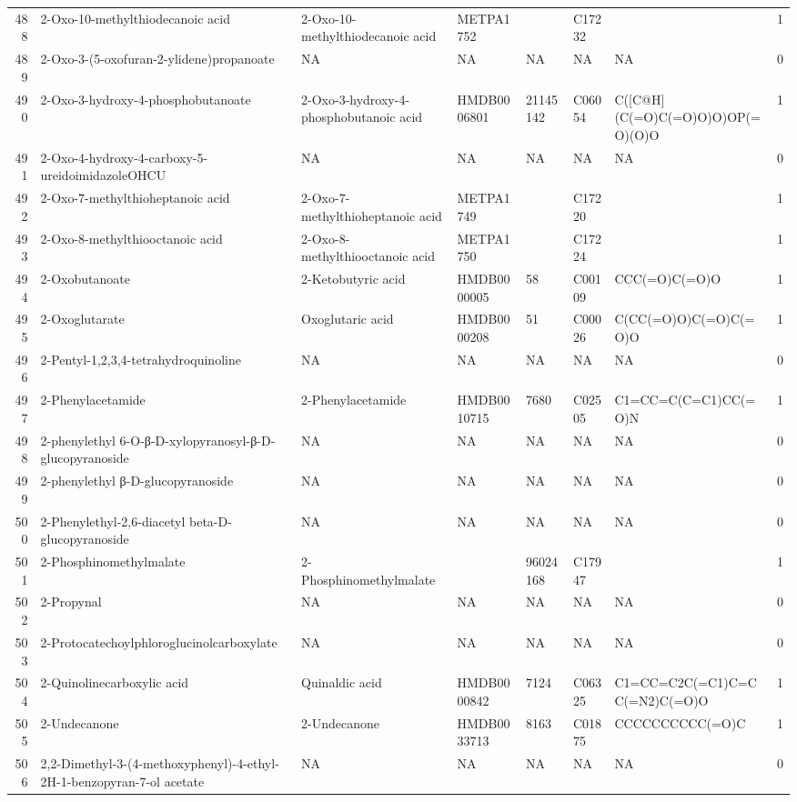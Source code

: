 \documentclass[a4paper]{article}
\begin{document}
\begin{longtable}{rlllllll}
  488 & 2-Oxo-10-methylthiodecanoic acid & 2-Oxo-10-methylthiodecanoic acid & METPA1752 &  & C17232 &  & 1 \\ 
  489 & 2-Oxo-3-(5-oxofuran-2-ylidene)propanoate & NA & NA & NA & NA & NA & 0 \\ 
  490 & 2-Oxo-3-hydroxy-4-phosphobutanoate & 2-Oxo-3-hydroxy-4-phosphobutanoic acid & HMDB0006801 & 21145142 & C06054 & C([C@H](C(=O)C(=O)O)O)OP(=O)(O)O & 1 \\ 
  491 & 2-Oxo-4-hydroxy-4-carboxy-5-ureidoimidazoleOHCU & NA & NA & NA & NA & NA & 0 \\ 
  492 & 2-Oxo-7-methylthioheptanoic acid & 2-Oxo-7-methylthioheptanoic acid & METPA1749 &  & C17220 &  & 1 \\ 
  493 & 2-Oxo-8-methylthiooctanoic acid & 2-Oxo-8-methylthiooctanoic acid & METPA1750 &  & C17224 &  & 1 \\ 
  494 & 2-Oxobutanoate & 2-Ketobutyric acid & HMDB0000005 & 58 & C00109 & CCC(=O)C(=O)O & 1 \\ 
  495 & 2-Oxoglutarate & Oxoglutaric acid & HMDB0000208 & 51 & C00026 & C(CC(=O)O)C(=O)C(=O)O & 1 \\ 
  496 & 2-Pentyl-1,2,3,4-tetrahydroquinoline & NA & NA & NA & NA & NA & 0 \\ 
  497 & 2-Phenylacetamide & 2-Phenylacetamide & HMDB0010715 & 7680 & C02505 & C1=CC=C(C=C1)CC(=O)N & 1 \\ 
  498 & 2-phenylethyl 6-O-β-D-xylopyranosyl-β-D-glucopyranoside & NA & NA & NA & NA & NA & 0 \\ 
  499 & 2-phenylethyl β-D-glucopyranoside & NA & NA & NA & NA & NA & 0 \\ 
  500 & 2-Phenylethyl-2,6-diacetyl beta-D-glucopyranoside & NA & NA & NA & NA & NA & 0 \\ 
  501 & 2-Phosphinomethylmalate & 2-Phosphinomethylmalate &  & 96024168 & C17947 &  & 1 \\ 
  502 & 2-Propynal & NA & NA & NA & NA & NA & 0 \\ 
  503 & 2-Protocatechoylphloroglucinolcarboxylate & NA & NA & NA & NA & NA & 0 \\ 
  504 & 2-Quinolinecarboxylic acid & Quinaldic acid & HMDB0000842 & 7124 & C06325 & C1=CC=C2C(=C1)C=CC(=N2)C(=O)O & 1 \\ 
  505 & 2-Undecanone & 2-Undecanone & HMDB0033713 & 8163 & C01875 & CCCCCCCCCC(=O)C & 1 \\ 
  506 & 2,2-Dimethyl-3-(4-methoxyphenyl)-4-ethyl-2H-1-benzopyran-7-ol acetate & NA & NA & NA & NA & NA & 0 \\ 

\end{longtable}
\end{document}
